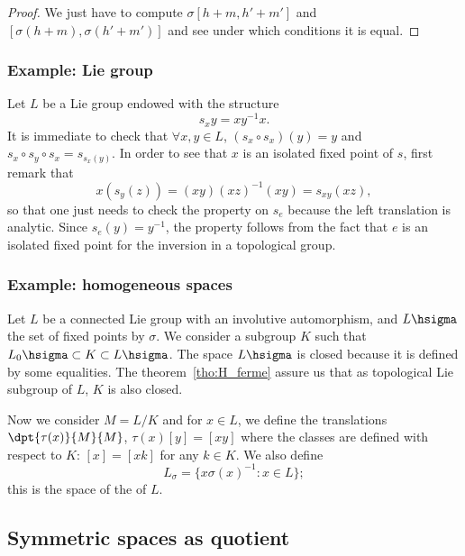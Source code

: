 \begin{proof}
We just have to compute $\sigma[h+m,h'+m']$ and $[\sigma(h+m),\sigma(h'+m')]$ and see under which conditions it is equal.
\end{proof}

\subsubsection{Example: Lie group}

Let $L$ be a Lie group endowed with the structure
\begin{equation}
  s_xy=xy^{-1} x.
\end{equation}
It is immediate to check that $\forall x,y\in L$,  $(s_x\circ s_x)(y)=y$ and $s_x\circ s_y\circ s_x=s_{s_x(y)}$. In order to see that $x$ is an isolated fixed point of $s$, first remark that
\[
    x(s_y(z))=(xy)(xz)^{-1}(xy)=s_{xy}(xz),
\]
so that one just needs to check the property on $s_e$ because the left translation is analytic. Since $s_e(y)=y^{-1}$, the property follows from the fact that $e$ is an isolated fixed point for the inversion in a topological group.

\subsubsection{Example: homogeneous spaces}

Let $L$ be a connected Lie group with an involutive automorphism, and $L\hsigma$ the set of fixed points by $\sigma$. We consider a subgroup $K$ such that $L_0\hsigma\subset K\subset L\hsigma$. The space $L\hsigma$ is closed because it is defined by some equalities. The theorem~\ref{tho:H_ferme} assure us that as topological Lie subgroup of $L$, $K$ is also closed.

Now we consider $M=L/K$ and for $x\in L$, we define the translations $\dpt{\tau(x)}{M}{M}$, $\tau(x)[y]=[xy]$ where the classes are defined with respect to $K$: $[x]=[xk]$ for any $k\in K$. We also define
\begin{equation}
   L_{\sigma}=\{ x\sigma(x)^{-1}:x\in L \};
\end{equation}
this is the space of the  of $L$.



\subsection{Symmetric spaces as quotient}

